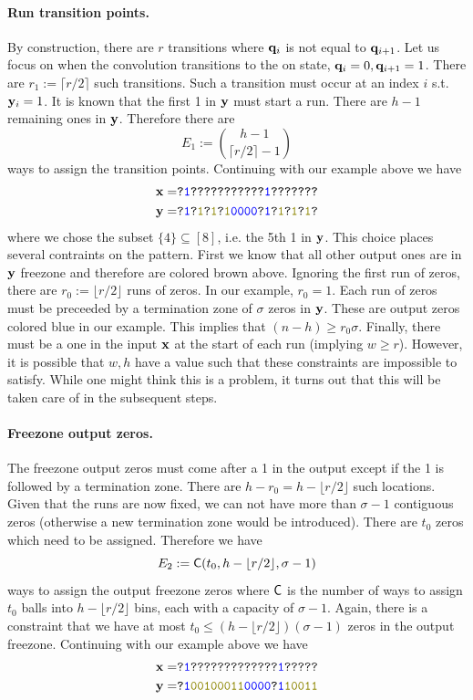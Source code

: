 \paragraph{Run transition points.} By construction, there are $r$ transitions where $\mathbf{q}_{i}$ is not equal to $\mathbf{q}_{i+1}$. Let us focus on when the convolution transitions to the on state, $\mathbf{q}_i=0,\mathbf{q}_{i+1}=1$. There are $r_1:=\lceil r/2\rceil$ such transitions. Such a transition must occur at an index $i$ s.t. $\mathbf{y}_i=1$. It is known that the first 1 in $\mathbf{y}$ must start a run. There are $h-1$ remaining ones in  $\mathbf{y}$. Therefore there are
$$
E_1:=\binom{h-1}{\lceil r/2\rceil-1}
$$
ways to assign the transition points.
Continuing with our example above we have
\begin{align*}
    \xv=&\texttt{?\blue{1}???????????\blue{1}???????}\\
    \yv=&\texttt{?\blue{1}?\olive{1}?\olive{1}?\olive{1}\blue{0000}?\blue{1}?\olive{1}?\olive{1}?\olive{1}?}
\end{align*}
where we chose the subset $\{4\}\subseteq[8]$, i.e. the 5th 1 in $\mathbf{y}$. This choice places several contraints on the pattern. First we know that all other output ones are in $\mathbf{y}$ freezone and therefore are colored brown above. Ignoring the first run of zeros, there are $r_0:=\lfloor r/2\rfloor$ runs of zeros. In our example, $r_0=1$. Each run of zeros must be preceeded by a termination zone of $\sigma$ zeros in $\mathbf{y}$. These are output zeros colored blue in our example. This implies that $(n-h)\geq r_0\sigma$. Finally, there must be a one in the input $\mathbf{x}$ at the start of each run (implying $w\geq r$). However, it is possible that $w,h$ have a value such that these constraints are impossible to satisfy. While one might think this is a problem, it turns out that this will be taken care of in the subsequent steps.

\paragraph{Freezone output zeros.} The freezone output zeros must come after a 1 in the output except if the 1 is followed by a termination zone. There are $h-r_0=h-\lfloor r/2\rfloor$ such locations. Given that the runs are now fixed, we can not have more than $\sigma-1$ contiguous zeros (otherwise a new termination zone would be introduced). There are $t_0$ zeros which need to be assigned. Therefore we have
$$
    E_2:=\mathsf{C}(t_0, h-\lfloor r/2\rfloor, \sigma-1)
$$
ways to assign the output freezone zeros where $\mathsf{C}$ is the number of ways to assign $t_0$ balls into $h-\lfloor r/2\rfloor$ bins, each with a capacity of $\sigma-1$.
Again, there is a constraint that we have at most $t_0\leq (h-\lfloor r/2\rfloor)(\sigma-1)$ zeros in the output freezone.
Continuing with our example above we have
\begin{align*}
    \xv=&\texttt{?\blue{1}?????????????\blue{1}?????}\\
    \yv=&\texttt{?\blue{1}\olive{00100011}\blue{0000}?\blue{1}\olive{10011}}
\end{align*}

